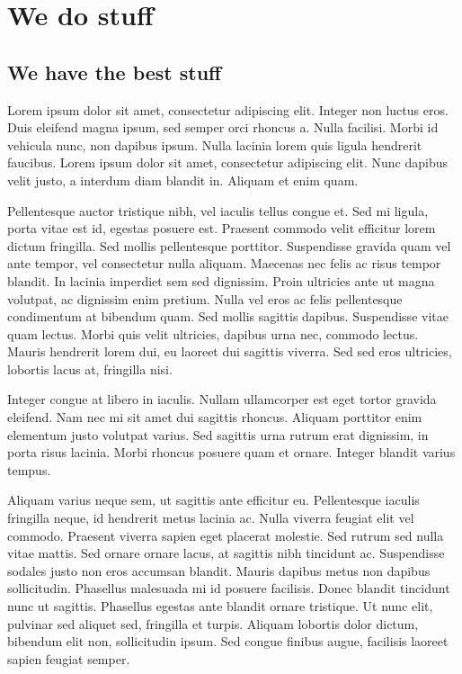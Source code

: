 \chapter{We do stuff}
\section{We have the best stuff}

Lorem ipsum dolor sit amet, consectetur adipiscing elit. Integer non luctus eros. Duis eleifend magna ipsum, sed semper orci rhoncus a. Nulla facilisi. Morbi id vehicula nunc, non dapibus ipsum. Nulla lacinia lorem quis ligula hendrerit faucibus. Lorem ipsum dolor sit amet, consectetur adipiscing elit. Nunc dapibus velit justo, a interdum diam blandit in. Aliquam et enim quam.

Pellentesque auctor tristique nibh, vel iaculis tellus congue et. Sed mi ligula, porta vitae est id, egestas posuere est. Praesent commodo velit efficitur lorem dictum fringilla. Sed mollis pellentesque porttitor. Suspendisse gravida quam vel ante tempor, vel consectetur nulla aliquam. Maecenas nec felis ac risus tempor blandit. In lacinia imperdiet sem sed dignissim. Proin ultricies ante ut magna volutpat, ac dignissim enim pretium. Nulla vel eros ac felis pellentesque condimentum at bibendum quam. Sed mollis sagittis dapibus. Suspendisse vitae quam lectus. Morbi quis velit ultricies, dapibus urna nec, commodo lectus. Mauris hendrerit lorem dui, eu laoreet dui sagittis viverra. Sed sed eros ultricies, lobortis lacus at, fringilla nisi.

Integer congue at libero in iaculis. Nullam ullamcorper est eget tortor gravida eleifend. Nam nec mi sit amet dui sagittis rhoncus. Aliquam porttitor enim elementum justo volutpat varius. Sed sagittis urna rutrum erat dignissim, in porta risus lacinia. Morbi rhoncus posuere quam et ornare. Integer blandit varius tempus.

Aliquam varius neque sem, ut sagittis ante efficitur eu. Pellentesque iaculis fringilla neque, id hendrerit metus lacinia ac. Nulla viverra feugiat elit vel commodo. Praesent viverra sapien eget placerat molestie. Sed rutrum sed nulla vitae mattis. Sed ornare ornare lacus, at sagittis nibh tincidunt ac. Suspendisse sodales justo non eros accumsan blandit. Mauris dapibus metus non dapibus sollicitudin. Phasellus malesuada mi id posuere facilisis. Donec blandit tincidunt nunc ut sagittis. Phasellus egestas ante blandit ornare tristique. Ut nunc elit, pulvinar sed aliquet sed, fringilla et turpis. Aliquam lobortis dolor dictum, bibendum elit non, sollicitudin ipsum. Sed congue finibus augue, facilisis laoreet sapien feugiat semper.

